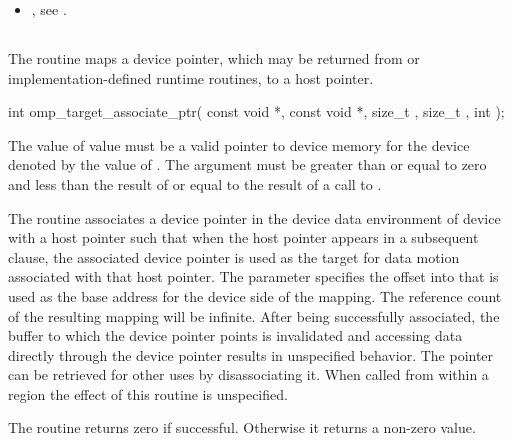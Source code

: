 \begin{ccppspecific}
\begin{itemize}
\item {}, see
.
\end{itemize}



\subsection{}
\label{subsec:omp_target_associate_ptr}
\summary

The  routine maps a device pointer, which may
be returned from  or implementation-defined runtime
routines, to a host pointer.

\format
\begin{ompcFunction}
int omp_target_associate_ptr(
  const void *,
  const void *,
  size_t ,
  size_t ,
  int 
);
\end{ompcFunction}

\constraints
The value of  value must be a valid pointer to device
memory for the device denoted by the value of . The 
 argument must be greater than or equal to zero and 
less than the result of  or equal to the 
result of a call to .

\effect
The  routine associates a device pointer
in the device data environment of device 
with a host pointer such that when the host pointer appears in a subsequent
 clause, the associated device pointer is used as the target for
data motion associated with that host pointer.  The 
parameter specifies the offset into  that is used as the
base address for the device side of the mapping. The reference count of the
resulting mapping will be infinite.  After being successfully associated, the
buffer to which the device pointer points is invalidated and accessing data
directly through the device pointer results in unspecified behavior.  The
pointer can be retrieved for other uses by disassociating it.
When called from within a  region
the effect of this routine is unspecified.

The routine returns zero if successful. Otherwise it returns a non-zero value.


\end{ccppspecific}
